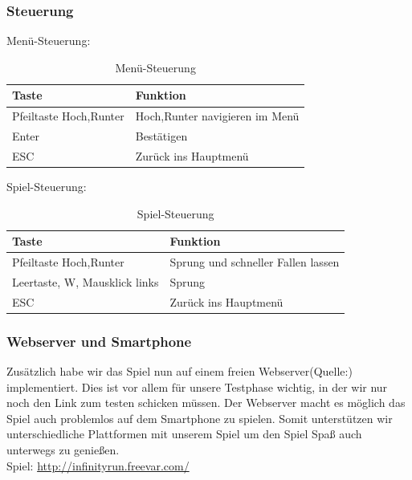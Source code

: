 \subsubsection{Steuerung}
Menü-Steuerung:
\begin{table}[H]
	\begin{tabular}{|l|l|}
		\toprule
		\textbf{Taste}& \textbf{Funktion}\\
		\midrule
		Pfeiltaste Hoch,Runter & Hoch,Runter navigieren im Menü	\\ 
		Enter & Bestätigen\\
		ESC & Zurück ins Hauptmenü	\\ 
		\bottomrule
	\end{tabular}
	\caption{Menü-Steuerung}
\end{table}
Spiel-Steuerung:
\begin{table}[H]
	\begin{tabular}{|l|l|}
		\toprule
		\textbf{Taste}& \textbf{Funktion}\\
		\midrule
		Pfeiltaste Hoch,Runter & Sprung und schneller Fallen lassen\\ 
		Leertaste, W, Mausklick links & Sprung\\
		ESC & Zurück ins Hauptmenü\\ 
		\bottomrule
	\end{tabular}
	\caption{Spiel-Steuerung}
\end{table}
\subsubsection{Webserver und Smartphone}
Zusätzlich habe wir das Spiel nun auf einem freien Webserver(Quelle:\cite{freevar}) implementiert. Dies ist vor allem für unsere Testphase wichtig, in der wir nur noch den Link zum testen schicken müssen. Der Webserver macht es möglich das Spiel auch problemlos auf dem Smartphone zu spielen. Somit unterstützen wir unterschiedliche Plattformen mit unserem Spiel um den Spiel Spaß auch unterwegs zu genießen.\\
Spiel: \url{http://infinityrun.freevar.com/}
\newpage
